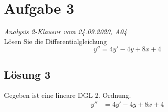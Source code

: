 \documentclass[main.tex]{subfiles}
\begin{document}
\section{Aufgabe 3}
\textit{Analysis 2-Klausur vom 24.09.2020, A04}\\
Lösen Sie die Differentialgleichung
\begin{equation*}
	y'' = 4y' - 4y + 8x + 4
\end{equation*}

\subsection{Lösung 3}
Gegeben ist eine lineare DGL 2. Ordnung. 
\begin{align*}
	y'' &= 4y' - 4y + 8x + 4
\end{align*}
\end{document}
